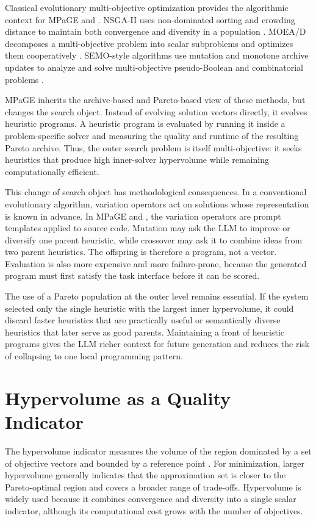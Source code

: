 \documentclass[../main.tex]{subfiles}
\begin{document}
Classical evolutionary multi-objective optimization provides the algorithmic context for MPaGE and \bmab{}. NSGA-II uses non-dominated sorting and crowding distance to maintain both convergence and diversity in a population \cite{deb2002nsga2}. MOEA/D decomposes a multi-objective problem into scalar subproblems and optimizes them cooperatively \cite{zhang2007moead}. SEMO-style algorithms use mutation and monotone archive updates to analyze and solve multi-objective pseudo-Boolean and combinatorial problems \cite{laumanns2004semo}.

MPaGE inherits the archive-based and Pareto-based view of these methods, but changes the search object. Instead of evolving solution vectors directly, it evolves heuristic programs. A heuristic program is evaluated by running it inside a problem-specific solver and measuring the quality and runtime of the resulting Pareto archive. Thus, the outer search problem is itself multi-objective: it seeks heuristics that produce high inner-solver hypervolume while remaining computationally efficient.

This change of search object has methodological consequences. In a conventional evolutionary algorithm, variation operators act on solutions whose representation is known in advance. In MPaGE and \bmab{}, the variation operators are prompt templates applied to source code. Mutation may ask the LLM to improve or diversify one parent heuristic, while crossover may ask it to combine ideas from two parent heuristics. The offspring is therefore a program, not a vector. Evaluation is also more expensive and more failure-prone, because the generated program must first satisfy the task interface before it can be scored.

The use of a Pareto population at the outer level remains essential. If the system selected only the single heuristic with the largest inner hypervolume, it could discard faster heuristics that are practically useful or semantically diverse heuristics that later serve as good parents. Maintaining a front of heuristic programs gives the LLM richer context for future generation and reduces the risk of collapsing to one local programming pattern.

\section{Hypervolume as a Quality Indicator}

The hypervolume indicator measures the volume of the region dominated by a set of objective vectors and bounded by a reference point \cite{zitzler1999multiobjective,fonseca2006hv}. For minimization, larger hypervolume generally indicates that the approximation set is closer to the Pareto-optimal region and covers a broader range of trade-offs. Hypervolume is widely used because it combines convergence and diversity into a single scalar indicator, although its computational cost grows with the number of objectives.
\end{document}
